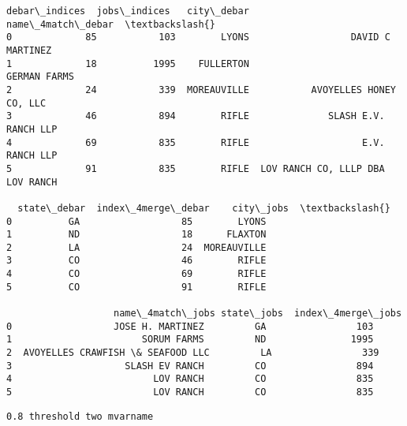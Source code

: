 \documentclass[11pt]{article}
\makeatletter
\newcommand{\boxspacing}{\kern\kvtcb@left@rule\kern\kvtcb@boxsep}
\newcommand{\prompt}[4]{
        {\ttfamily\llap{{\color{#2}[#3]:\hspace{3pt}#4}}\vspace{-\baselineskip}}
    }
\makeatother
\begin{document}
            \begin{tcolorbox}[breakable, size=fbox, boxrule=.5pt, pad at break*=1mm, opacityfill=0]
\prompt{Out}{outcolor}{182}{\boxspacing}
\begin{Verbatim}[commandchars=\\\{\}]
   debar\_indices  jobs\_indices   city\_debar                 name\_4match\_debar  \textbackslash{}
0             85           103        LYONS                  DAVID C MARTINEZ
1             18          1995    FULLERTON                      GERMAN FARMS
2             24           339  MOREAUVILLE           AVOYELLES HONEY CO, LLC
3             46           894        RIFLE              SLASH E.V. RANCH LLP
4             69           835        RIFLE                    E.V. RANCH LLP
5             91           835        RIFLE  LOV RANCH CO, LLLP DBA LOV RANCH

  state\_debar  index\_4merge\_debar    city\_jobs  \textbackslash{}
0          GA                  85        LYONS
1          ND                  18      FLAXTON
2          LA                  24  MOREAUVILLE
3          CO                  46        RIFLE
4          CO                  69        RIFLE
5          CO                  91        RIFLE

                   name\_4match\_jobs state\_jobs  index\_4merge\_jobs
0                  JOSE H. MARTINEZ         GA                103
1                       SORUM FARMS         ND               1995
2  AVOYELLES CRAWFISH \& SEAFOOD LLC         LA                339
3                    SLASH EV RANCH         CO                894
4                         LOV RANCH         CO                835
5                         LOV RANCH         CO                835
\end{Verbatim}
\end{tcolorbox}
        
    \begin{Verbatim}[commandchars=\\\{\}]
0.8 threshold two mvarname
    \end{Verbatim}
\end{document}
